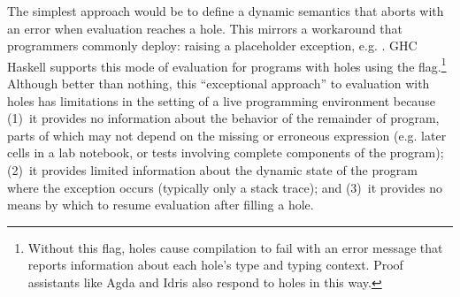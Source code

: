 The simplest approach would be to define a dynamic semantics that aborts with an error when evaluation reaches a hole. 
%
This mirrors a workaround that programmers commonly deploy: 
raising a placeholder exception, e.g. . 
GHC Haskell supports this mode of evaluation for programs with holes using the  flag.\footnote{
Without this flag, holes cause compilation to fail with an error message that reports information about each hole's type and typing context. 
Proof assistants like Agda \cite{norell:thesis,norell2009dependently} and Idris \cite{brady2013idris} also respond to holes in this way.
} 
Although better than nothing, this ``exceptional approach'' to evaluation with holes has limitations 
in the setting of a live programming environment because 
(1)~it provides no information about the behavior of the remainder of program, 
parts of which may not depend on the missing or erroneous expression (e.g. later cells in a lab notebook, or tests involving complete components of the program); 
(2)~it provides limited information about the dynamic state of the program where the exception occurs
(typically only a stack trace);  
and 
(3)~it provides no means by which to resume evaluation after filling a hole.



